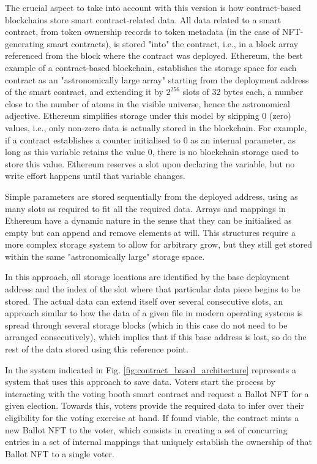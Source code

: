 \documentclass[./4_GeneralApproach.tex]{subfiles}
\begin{document}
The crucial aspect to take into account with this version is how contract-based blockchains store smart contract-related data. All data related to a smart contract, from token ownership records to token metadata (in the case of NFT-generating smart contracts), is stored "into" the contract, i.e., in a block array referenced from the block where the contract was deployed. Ethereum, the best example of a contract-based blockchain, establishes the storage space for each contract as an "astronomically large array" starting from the deployment address of the smart contract, and extending it by $ 2^{256} $ slots of 32 bytes each, a number close to the number of atoms in the visible universe, hence the astronomical adjective. Ethereum simplifies storage under this model by skipping 0 (zero) values, i.e., only non-zero data is actually stored in the blockchain. For example, if a contract establishes a counter initialised to 0 as an internal parameter, as long as this variable retains the value 0, there is no blockchain storage used to store this value. Ethereum reserves a slot upon declaring the variable, but no write effort happens until that variable changes.
\par
Simple parameters are stored sequentially from the deployed address, using as many slots as required to fit all the required data. Arrays and mappings in Ethereum have a dynamic nature in the sense that they can be initialised as empty but can append and remove elements at will. This structures require a more complex storage system to allow for arbitrary grow, but they still get stored within the same "astronomically large" storage space.
\par
In this approach, all storage locations are identified by the base deployment address and the index of the slot where that particular data piece begins to be stored. The actual data can extend itself over several consecutive slots, an approach similar to how the data of a given file in modern operating systems is spread through several storage blocks (which in this case do not need to be arranged consecutively), which implies that if this base address is lost, so do the rest of the data stored using this reference point.
\par
In the system indicated in Fig. \ref{fig:contract_based_architecture} represents a system that uses this approach to save data. Voters start the process by interacting with the voting booth smart contract and request a Ballot NFT for a given election. Towards this, voters provide the required data to infer over their eligibility for the voting exercise at hand. If found viable, the contract mints a new Ballot NFT to the voter, which consists in creating a set of concurring entries in a set of internal mappings that uniquely establish the ownership of that Ballot NFT to a single voter.
\end{document}
